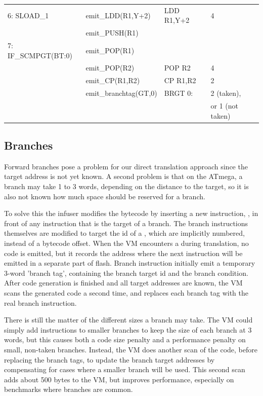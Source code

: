 \begin{table}
\begin{tabular}{llll}
    6: SLOAD\_1         & emit\_LDD(R1,Y+2)                  & LDD R1,Y+2 & 4 \\
                        & emit\_PUSH(R1)                     &            & \\
    7: IF\_SCMPGT(BT:0) & emit\_POP(R1)                      &            & \\
                        & emit\_POP(R2)                      & POP R2     & 4 \\
                        & emit\_CP(R1,R2)                    & CP R1,R2   & 2 \\
                        & emit\_branchtag(GT,0)              & BRGT 0:    & 2 (taken), \\
                        &                                    &            & or 1 (not taken) \\
    \bottomrule
    \end{tabular}
\end{table}

\subsection{Branches}
Forward branches pose a problem for our direct translation approach since the target address is not yet known. A second problem is that on the ATmega, a branch may take 1 to 3 words, depending on the distance to the target, so it is also not known how much space should be reserved for a branch.

To solve this the infuser modifies the bytecode by inserting a new instruction, , in front of any instruction that is the target of a branch. The branch instructions themselves are modified to target the id of a , which are implicitly numbered, instead of a bytecode offset. When the VM encounters a  during translation, no code is emitted, but it records the address where the next instruction will be emitted in a separate part of flash. Branch instruction initially emit a temporary 3-word 'branch tag', containing the branch target id and the branch condition. After code generation is finished and all target addresses are known, the VM scans the generated code a second time, and replaces each branch tag with the real branch instruction.

There is still the matter of the different sizes a branch may take. The VM could simply add  instructions to smaller branches to keep the size of each branch at 3 words, but this causes both a code size penalty and a performance penalty on small, non-taken branches. Instead, the VM does another scan of the code, before replacing the branch tags, to update the branch target addresses by compensating for cases where a smaller branch will be used. This second scan adds about 500 bytes to the VM, but improves performance, especially on benchmarks where branches are common.

